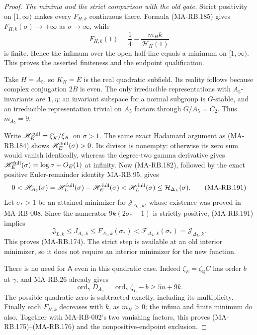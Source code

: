 \begin{proof}
\emph{The minima and the strict comparison with the old gate.}
Strict positivity on \([1,\infty)\) makes every
\(F_{H,k}\) continuous there. Formula (MA-RB.185)
gives \(F_{H,k}(\sigma)\to+\infty\) as
\(\sigma\to\infty\), while
\[
             F_{H,k}(1)
                    =\frac14-\frac{m_Hk}{\mathscr H_H(1)}
 \tag{MA-RB.190}
\]
is finite. Hence the infimum over the open
half-line equals a minimum on \([1,\infty)\).
This proves the asserted finiteness and the
endpoint qualification.

Take \(H=A_5\), so \(K_H=E\) is the real quadratic
subfield. Its reality follows because complex
conjugation \(2B\) is even. The only irreducible
representations with \(A_5\)-invariants are
\(\mathbf1,\eta\): an invariant subspace for a
normal subgroup is \(G\)-stable, and an irreducible
representation trivial on \(A_5\) factors through
\(G/A_5=C_2\). Thus \(m_{A_5}=9\).

Write \(\mathscr H_K^{\rm full}=\xi_K'/\xi_K\)
on \(\sigma>1\). The same exact Hadamard
argument as (MA-RB.184) shows
\(\mathscr H_E^{\rm full}(\sigma)>0\).
Its divisor is nonempty: otherwise its zero
sum would vanish identically, whereas the
degree-two gamma derivative gives
\(\mathscr H_E^{\rm full}(\sigma)
 =\log\sigma+O_E(1)\) at infinity.
Now (MA-RB.182), followed by the exact positive
Euler-remainder identity MA-RB.95, gives
\[
 0<\mathscr H_{A_5}(\sigma)
    =\mathscr H_L^{\rm full}(\sigma)
                    -\mathscr H_E^{\rm full}(\sigma)
    <\mathscr H_L^{\rm full}(\sigma)
    \le\mathcal H_{\Delta_L}(\sigma).
 \tag{MA-RB.191}
\]
Let \(\sigma_*>1\) be an attained minimizer for
\(\mathcal J_{\Delta_L,k}\), whose existence
was proved in MA-RB-008. Since the numerator
\(9k(2\sigma_*-1)\) is strictly positive,
(MA-RB.191) implies
\[
 \mathfrak J_{L,k}\le J_{A_5,k}
    \le F_{A_5,k}(\sigma_*)
    <\mathcal F_{\Delta_L,k}(\sigma_*)
     =\mathcal J_{\Delta_L,k}.
 \tag{MA-RB.192}
\]
This proves (MA-RB.174). The strict step is
available at an old interior minimizer, so it
does not require an interior minimizer for
the new function.

There is no need for \(\mathsf A\) even in this
quadratic case. Indeed \(\zeta_E=\zeta_{\mathbb Q}C\)
has order \(b\) at \(\gamma\), and MA-RB.26
already gives
\[
       \operatorname{ord}_\gamma D_{A_5}
          =\operatorname{ord}_\gamma\zeta_L-b
                              \ge5n+9k.
 \tag{MA-RB.193}
\]
The possible quadratic zero is subtracted
exactly, including its multiplicity.
Finally each \(F_{H,k}\) decreases with \(k\),
as \(m_H>0\); the infima and finite minimum
do also. Together with MA-RB-002's two vanishing
factors, this proves (MA-RB.175)--(MA-RB.176)
and the nonpositive-endpoint exclusion.
\end{proof}

